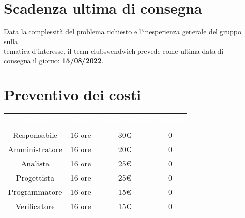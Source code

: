 \section{Scadenza ultima di consegna}
Data la complessità del problema richiesto e l'inesperienza generale del gruppo sulla \\
tematica d'interesse, il team clubswendwich prevede come ultima data di consegna 
il giorno: \textbf{15/08/2022}.

\section{Preventivo dei costi}

{\renewcommand{\arraystretch}{1.5}
\begin{tabular}{cccc}
	\rowcolor[RGB]{33, 73, 50}
	\textcolor{white}{\textbf{Ruolo}} & \textcolor{white}{\textbf{Ore}} 
    & \textcolor{white}{\textbf{Costo Orario}} & \textcolor{white}{\textbf{Totale}}\\
	\rowcolor[RGB]{216, 235, 171}
	Responsabile & 16 ore & 30€ & 0      \\
	\rowcolor[RGB]{233, 245, 206}
	Amministratore & 16 ore & 20€ & 0    \\
    \rowcolor[RGB]{216, 235, 171}
	Analista & 16 ore & 25€ & 0          \\
	\rowcolor[RGB]{233, 245, 206}
	Progettista & 16 ore & 25€ & 0       \\
    \rowcolor[RGB]{216, 235, 171}
	Programmatore & 16 ore & 15€ & 0     \\
	\rowcolor[RGB]{233, 245, 206}
	Verificatore & 16 ore & 15€ & 0      \\
\end{tabular}	
}

